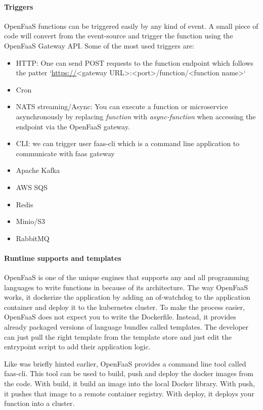 \documentclass[12pt,titlepage]{article}
\begin{document}
\paragraph{Triggers}
\label{sec:org70ee941}
OpenFaaS functions can be triggered easily by any kind of event. A small piece
of code will convert from the event-source and trigger the function using the
OpenFaaS Gateway API. Some of the most used triggers are:
\begin{itemize}
\item HTTP: One can send POST requests to the function endpoint which follows the
patter `\url{https://}<gateway URL>:<port>/function/<function name>`
\item Cron
\item NATS streaming/Async: You can execute a function or microservice
asynchronously by replacing \emph{function} with \emph{async-function} when accessing the
endpoint via the OpenFaaS gateway.
\item CLI: we can trigger user faas-cli which is a command line application to
communicate with faas gateway
\item Apache Kafka
\item AWS SQS
\item Redis
\item Minio/S3
\item RabbitMQ
\end{itemize}

\paragraph{Runtime supports and templates}
\label{sec:orgc34515f}

OpenFaaS is one of the unique engines that supports any and all programming
languages to write functions in because of its architecture. The way OpenFaaS
works, it dockerize the application by adding an of-watchdog to the application
container and deploy it to the kubernetes cluster. To make the process easier,
OpenFaaS does not expect you to write the Dockerfile. Instead, it provides
already packaged versions of language bundles called templates. The developer
can just pull the right template from the template store and just edit the
entrypoint script to add their application logic.

Like was briefly hinted earlier, OpenFaaS provides a command line tool called
faas-cli. This tool can be used to build, push and deploy the docker images from
the code. With build, it build an image into the local Docker library. With
push, it pushes that image to a remote container registry. With deploy, it
deploys your function into a cluster.
\end{document}
